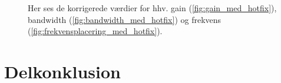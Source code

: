 \begin{figure}[h!]
	\centering
  	\caption{Her ses de korrigerede værdier for hhv. gain (\ref{fig:gain_med_hotfix}), bandwidth (\ref{fig:bandwidth_med_hotfix}) og frekvens (\ref{fig:frekvensplacering_med_hotfix}).}
	\label{fig:korr}
\end{figure}

\section{Delkonklusion}



